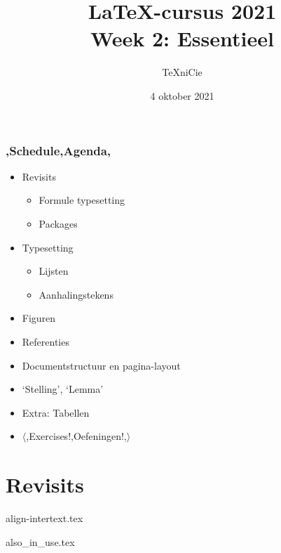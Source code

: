 \documentclass{cursuspresentatie}
\title[LaTeX-cursus 2021 -- Week 2]{%
	\texorpdfstring{%
		\LaTeX{}-cursus 2021\\Week 2: Essentieel%
		\\ \conceptText
	}{%
		Week 2 -- LaTeX-cursus 2021%
	}%
}
\author{\TeX niCie}
\date{4 oktober 2021}
\def\importslide#1#2{%
	{#2}
}
\begin{document}

\begin{frame}
	\titlepage
	\centering
\end{frame}


\begin{frame}
	\frametitle{\lang,Schedule,Agenda,}
	
	\begin{itemize}
		\item Revisits
		\begin{itemize}
			\item Formule typesetting
			\item Packages
		\end{itemize}
		\item Typesetting
		\begin{itemize}
			\item Lijsten
			\item Aanhalingstekens
		\end{itemize}
		\item Figuren
		\item Referenties
		\item Documentstructuur en pagina-layout
		\item `Stelling', `Lemma'
		\item Extra: Tabellen
		\item $ \mathbf\langle $\lang,Exercises!,Oefeningen!,$ \rangle $
	\end{itemize}
\end{frame}

	\clearrecentlist
	\def\assetdir{assets}

	\section{Revisits}

	\importslide{math}{align-intertext.tex}
	\importslide{math}{also_in_use.tex}



	
\end{document}

